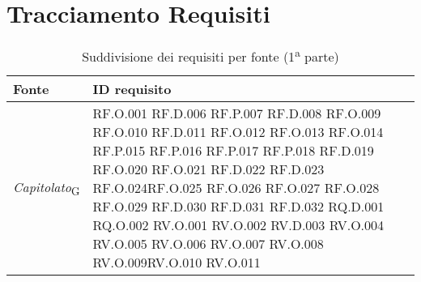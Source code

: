 \section{Tracciamento Requisiti}
\begin{table}[H]
\centering
    \begin{tabular}{|C{3.0cm}|C{3.0cm}|}
        \hline
         \textbf{Fonte} &
         \textbf{ID requisito}   
          \\
          \hline
          \textit{Capitolato}\textsubscript{G} & RF.O.001  \newline RF.D.006 \newline   
                        RF.P.007 \newline  RF.D.008 \newline
                        RF.O.009  \newline RF.O.010 \newline
                        RF.D.011   \newline      RF.O.012 \newline
                        RF.O.013  \newline       RF.O.014 \newline
                        RF.P.015  \newline        RF.P.016 \newline
                        RF.P.017  \newline        RF.P.018 \newline
                        RF.D.019   \newline      RF.O.020 \newline
RF.O.021 \newline RF.D.022 \newline RF.D.023  \newline  RF.O.024\newline RF.O.025 \newline
RF.O.026 \newline RF.O.027  \newline RF.O.028  \newline  RF.O.029 \newline RF.D.030 \newline RF.D.031 \newline RF.D.032 \newline
RQ.D.001 \newline RQ.O.002 \newline 
RV.O.001 \newline RV.O.002  \newline RV.D.003   \newline  RV.O.004   \newline RV.O.005 \newline
RV.O.006 \newline RV.O.007 \newline RV.O.008  \newline  RV.O.009\newline RV.O.010 \newline
RV.O.011 \\
\hline
    \end{tabular}
    \caption{Suddivisione dei requisiti per fonte (1\textsuperscript{a} parte)}
\end{table}

